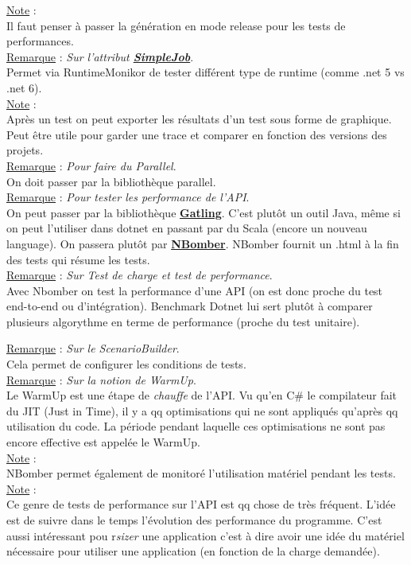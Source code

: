 \documentclass[a4paper,12pt,twoside]{article}
\newcommand{\urlcolor}{magenta}  %
\newcommand{\keycolor}{purple} %
\newcommand{\rem}[2]{\noindent\underline{Remarque} : \textit{#1}.\\ \indent #2}
\newcommand{\note}[1]{\noindent\underline{Note} : \\ \indent #1}
\newcommand{\keyref}[2]{\hypersetup{urlcolor=\keycolor} \href{#1}{\textbf{#2}}\hypersetup{urlcolor=\urlcolor}}
\begin{document}
\note{Il faut penser à passer la génération en mode release pour les tests de performances.}\\

\rem{Sur l'attribut \keyref{https://benchmarkdotnet.org/articles/configs/jobs.html}{SimpleJob}}{Permet via RuntimeMonikor de tester différent type de runtime (comme .net 5 vs .net 6).}\\

\note{Après un test on peut exporter les résultats d'un test sous forme de graphique. Peut être utile pour garder une trace et comparer en fonction des versions des projets.}\\

\rem{Pour faire du Parallel}{On doit passer par la bibliothèque parallel.}\\

\rem{Pour tester les performance de l'API}{On peut passer par la bibliothèque \keyref{https://gatling.io/}{Gatling}. C'est plutôt un outil Java, même si on peut l'utiliser dans dotnet en passant par du Scala (encore un nouveau language). On passera plutôt par \keyref{https://nbomber.com/}{NBomber}. NBomber fournit un .html à la fin des tests qui résume les tests.}\\

\rem{Sur Test de charge et test de performance}{Avec Nbomber on test la performance d'une API (on est donc proche du test end-to-end ou d'intégration). Benchmark Dotnet lui sert plutôt à comparer plusieurs algorythme en terme de performance (proche du test unitaire).}

\rem{Sur le ScenarioBuilder}{Cela permet de configurer les conditions de tests.}\\

\rem{Sur la notion de WarmUp}{Le WarmUp est une étape de \textit{chauffe} de l'API. Vu qu'en C\# le compilateur fait du JIT (Just in Time), il y a qq optimisations qui ne sont appliqués qu'après qq utilisation du code. La période pendant laquelle ces optimisations ne sont pas encore effective est appelée le WarmUp.}\\

\note{NBomber permet également de monitoré l'utilisation matériel pendant les tests.}\\

\note{Ce genre de tests de performance sur l'API est qq chose de très fréquent. L'idée est de suivre dans le temps l'évolution des performance du programme. C'est aussi intéressant pou r\textit{sizer} une application c'est à dire avoir une idée du matériel nécessaire pour utiliser une application (en fonction de la charge demandée).}\\
\end{document}
